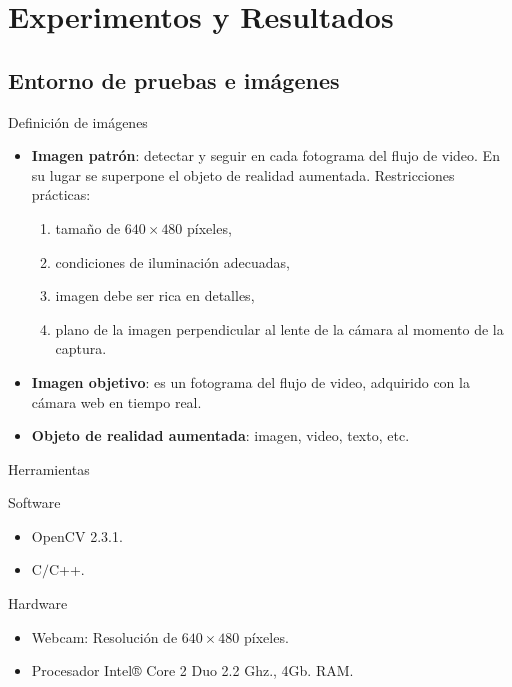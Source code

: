 \section{Experimentos y Resultados}
\subsection{Entorno de pruebas e imágenes} %
    \begin{frame}{Definición de imágenes}
      \begin{itemize}
	\item<1-> \textbf{Imagen patrón}: detectar y seguir en cada fotograma del flujo de video. En su lugar se superpone el objeto de realidad aumentada.
	Restricciones prácticas:
	  \begin{enumerate}
	  \item \small tamaño de $640 \times 480$ píxeles,
	  \item \small condiciones de iluminación adecuadas,
	  \item \small imagen debe ser rica en detalles,
	  \item \small plano de la imagen perpendicular al lente de la cámara al momento de la captura.
	  \end{enumerate}

	\item<2-> \textbf{Imagen objetivo}: es un fotograma del flujo de video, adquirido con la cámara web en tiempo real.
	
	\item<3-> \textbf{Objeto de realidad aumentada}: imagen, video, texto, etc. 
      \end{itemize}
    \end{frame}
    
    \begin{frame}{Herramientas}
      \begin{block}{Software}
	\begin{itemize}
	 \item OpenCV 2.3.1.
	 \item C$\slash$C++.
	\end{itemize}
      \end{block}
      \begin{block}{Hardware}
	\begin{itemize}
	  \item Webcam: Resolución de $640 \times 480$ píxeles.
	  \item Procesador Intel® Core 2 Duo 2.2 Ghz., 4Gb. RAM.
	\end{itemize}
      \end{block}
    \end{frame}

